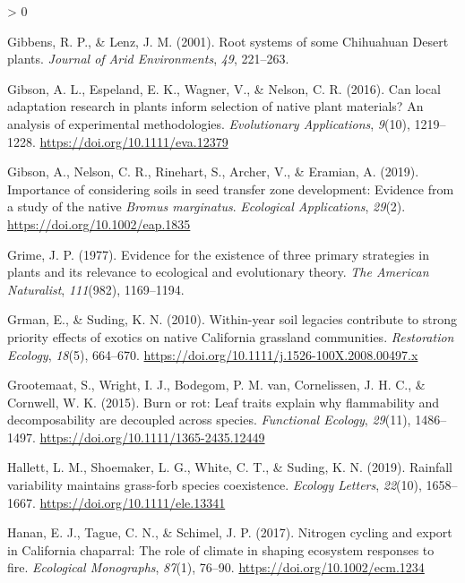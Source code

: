 \documentclass[
  11pt,
  a4paper,
]{article}
\newlength{\cslhangindent}
\newenvironment{CSLReferences}[2] %
 {%
  \setlength{\parindent}{0pt}
  \ifodd #1 \everypar{\setlength{\hangindent}{\cslhangindent}}\ignorespaces\fi
  \ifnum #2 > 0
  \setlength{\parskip}{#2\baselineskip}
  \fi
 }%
 {}
\begin{document}
\begin{CSLReferences}{1}{0}
\leavevmode\hypertarget{ref-Gibbens2001}{}%
Gibbens, R. P., \& Lenz, J. M. (2001). Root systems of some {Chihuahuan} {Desert} plants. \emph{Journal of Arid Environments}, \emph{49}, 221--263.

\leavevmode\hypertarget{ref-Gibson2016eva}{}%
Gibson, A. L., Espeland, E. K., Wagner, V., \& Nelson, C. R. (2016). Can local adaptation research in plants inform selection of native plant materials? {An} analysis of experimental methodologies. \emph{Evolutionary Applications}, \emph{9}(10), 1219--1228. \url{https://doi.org/10.1111/eva.12379}

\leavevmode\hypertarget{ref-Gibson2019}{}%
Gibson, A., Nelson, C. R., Rinehart, S., Archer, V., \& Eramian, A. (2019). Importance of considering soils in seed transfer zone development: Evidence from a study of the native \emph{{Bromus} marginatus}. \emph{Ecological Applications}, \emph{29}(2). \url{https://doi.org/10.1002/eap.1835}

\leavevmode\hypertarget{ref-Grime1977}{}%
Grime, J. P. (1977). {Evidence for the existence of three primary strategies in plants and its relevance to ecological and evolutionary theory}. \emph{The American Naturalist}, \emph{111}(982), 1169--1194.

\leavevmode\hypertarget{ref-Grman2010}{}%
Grman, E., \& Suding, K. N. (2010). {Within-year soil legacies contribute to strong priority effects of exotics on native California grassland communities}. \emph{Restoration Ecology}, \emph{18}(5), 664--670. \url{https://doi.org/10.1111/j.1526-100X.2008.00497.x}

\leavevmode\hypertarget{ref-Grootemaat2015}{}%
Grootemaat, S., Wright, I. J., Bodegom, P. M. van, Cornelissen, J. H. C., \& Cornwell, W. K. (2015). {Burn or rot: Leaf traits explain why flammability and decomposability are decoupled across species}. \emph{Functional Ecology}, \emph{29}(11), 1486--1497. \url{https://doi.org/10.1111/1365-2435.12449}

\leavevmode\hypertarget{ref-Hallett2019}{}%
Hallett, L. M., Shoemaker, L. G., White, C. T., \& Suding, K. N. (2019). {Rainfall variability maintains grass-forb species coexistence}. \emph{Ecology Letters}, \emph{22}(10), 1658--1667. \url{https://doi.org/10.1111/ele.13341}

\leavevmode\hypertarget{ref-Hanan2017}{}%
Hanan, E. J., Tague, C. N., \& Schimel, J. P. (2017). {Nitrogen cycling and export in California chaparral: The role of climate in shaping ecosystem responses to fire}. \emph{Ecological Monographs}, \emph{87}(1), 76--90. \url{https://doi.org/10.1002/ecm.1234}


\end{CSLReferences}
\end{document}
